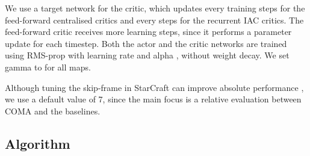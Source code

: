 \documentclass[letterpaper]{article}
\newcommand{\citep}{\cite}
\begin{document}
We use a target network for the critic, which updates every  training 
steps for the feed-forward centralised critics and every  steps for the 
recurrent IAC critics. The feed-forward critic receives more learning steps, 
since it performs a parameter update for each timestep. Both the actor and the 
critic networks are trained using RMS-prop with learning rate  and 
alpha , without weight decay.  We set gamma to  for all maps.

Although tuning the skip-frame in StarCraft can improve absolute 
performance \citep{peng2017multiagent}, we use a default value of 7, since the 
main focus is a relative evaluation between COMA and the baselines.


\subsection*{Algorithm}
\end{document}
